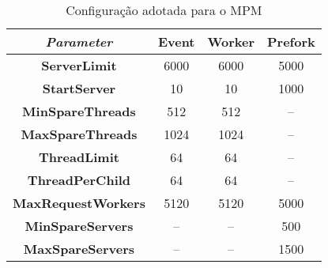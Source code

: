 \begin{table}
  \centering
  \begin{tabular}{|c|c|c|c|}
  \hline
    \textit{Parameter} & \textbf{Event} & \textbf{Worker} & \textbf{Prefork} \\
      \hline\hline
    \textbf{ServerLimit} & 6000 & 6000 & 5000\\
      \hline
    \textbf{StartServer} & 10 & 10 & 1000\\
      \hline
    \textbf{MinSpareThreads} & 512 & 512 & --\\
      \hline
    \textbf{MaxSpareThreads} & 1024 & 1024 & --\\
      \hline
    \textbf{ThreadLimit} & 64 & 64 & --\\
      \hline
    \textbf{ThreadPerChild} & 64 & 64 & --\\
      \hline
    \textbf{MaxRequestWorkers} & 5120 & 5120 & 5000\\
      \hline
    \textbf{MinSpareServers} & -- & -- & 500\\
      \hline
    \textbf{MaxSpareServers} & -- & -- & 1500\\
      \hline
  \end{tabular}

  \caption{Configuração adotada para o MPM}
  \label{tab:configuration}

\end{table}

